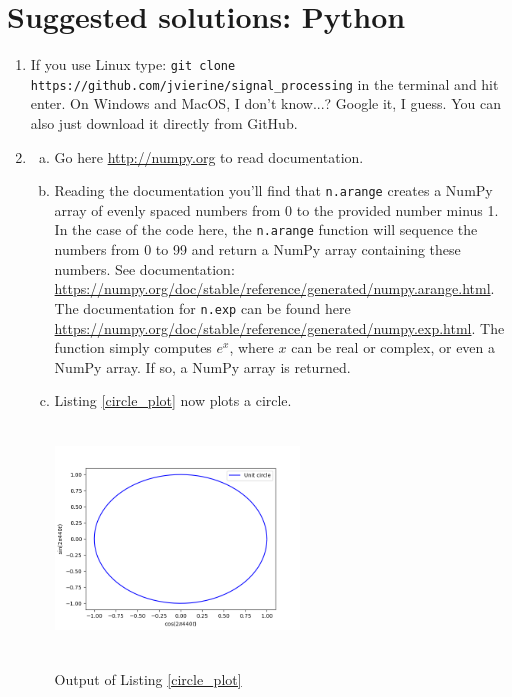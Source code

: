 \newpage
\section{Suggested solutions: Python}


\begin{enumerate}
\item If you use Linux type: \verb|git clone https://github.com/jvierine/signal_processing| in the terminal and hit enter.
On Windows and MacOS, I don't know...? Google it, I guess. You can also just download it directly from GitHub.

\item 
\begin{enumerate}[a)]
\item Go here \url{http://numpy.org} to read documentation. 
\item Reading the documentation you'll find that \verb|n.arange| creates a NumPy array 
      of evenly spaced numbers from 0 to the provided number minus 1. In the case of the code here, 
      the \verb|n.arange| function will sequence the numbers from 0 to 99 and return a NumPy array containing these numbers. 
      See documentation: \url{https://numpy.org/doc/stable/reference/generated/numpy.arange.html}.
      The documentation for \verb|n.exp| can be found here \url{https://numpy.org/doc/stable/reference/generated/numpy.exp.html}.
      The function simply computes $e^{x}$, where $x$ can be real or complex, or even a NumPy array. If so, a NumPy array is returned. 
\item Listing \ref{circle_plot} now plots a circle. 


\begin{marginfigure}
\includegraphics[width=6.5cm,height=6.0cm]{ch02/figures/circle_plot.png}
\caption{Output of Listing \ref{circle_plot}}
\end{marginfigure}


\end{enumerate}
\end{enumerate}
